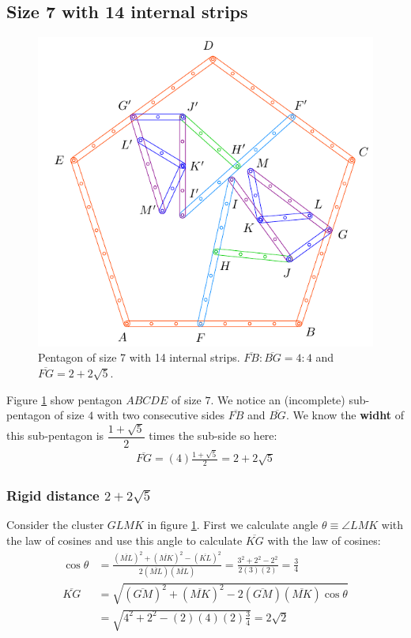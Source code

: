 \documentclass[11pt]{article}
\begin{document}
\subsection{Size 7 with 14 internal strips}

\begin{figure}[h]
\centering
\includegraphics[scale=1]{7/penta7-14a}
\caption{Pentagon of size 7 with 14 internal strips. $\overline{FB} : \overline{BG} = 4:4$ and $\overline{FG} = 2 + 2\sqrt5$.}
\label{fig:penta7-14a}
\end{figure}

Figure \ref{fig:penta7-14a} show pentagon $ABCDE$ of size $7$. We notice an (incomplete) sub-pentagon of size $4$ with two consecutive sides $\overline{FB}$ and $\overline{BG}$. We know the \textbf{widht} of this sub-pentagon is $\dfrac{1+\sqrt5}{2}$ times the sub-side so here:
\begin{align}
\overline{FG} = (4)\frac{1 + \sqrt5}2 = 2 + 2\sqrt5
\end{align}

\subsubsection{Rigid distance $2 + 2\sqrt5$}

Consider the cluster $GLMK$ in figure \ref{fig:penta7-14a}. First we calculate angle $\theta \equiv \angle{LMK}$ with the law of cosines and use this angle to calculate $\overline{KG}$ with the law of cosines:
\begin{align}
\cos\theta &= \frac{(\overline{ML})^2 + (\overline{MK})^2 - (\overline{KL})^2}
 {2(\overline{ML})(\overline{ML})}
 = \frac{3^2 + 2^2 - 2^2}{2(3)(2)} = \frac{3}4 \\
\overline{KG} &= \sqrt{(\overline{GM})^2 + (\overline{MK})^2
 - 2(\overline{GM})(\overline{MK})\cos\theta} \nonumber\\
 &= \sqrt{4^2 + 2^2 - (2)(4)(2)\frac{3}4} = 2\sqrt2
\end{align}
\end{document}
